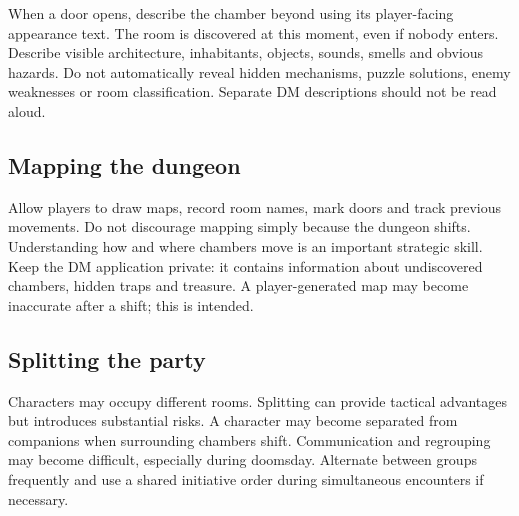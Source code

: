 When a door opens, describe the chamber beyond using its player-facing appearance text. The room is discovered at this moment, even if nobody enters. Describe visible architecture, inhabitants, objects, sounds, smells and obvious hazards. Do not automatically reveal hidden mechanisms, puzzle solutions, enemy weaknesses or room classification. Separate DM descriptions should not be read aloud.

\subsection{Mapping the dungeon}

Allow players to draw maps, record room names, mark doors and track previous movements. Do not discourage mapping simply because the dungeon shifts. Understanding how and where chambers move is an important strategic skill. Keep the DM application private: it contains information about undiscovered chambers, hidden traps and treasure. A player-generated map may become inaccurate after a shift; this is intended.

\subsection{Splitting the party}

Characters may occupy different rooms. Splitting can provide tactical advantages but introduces substantial risks. A character may become separated from companions when surrounding chambers shift. Communication and regrouping may become difficult, especially during doomsday. Alternate between groups frequently and use a shared initiative order during simultaneous encounters if necessary.
